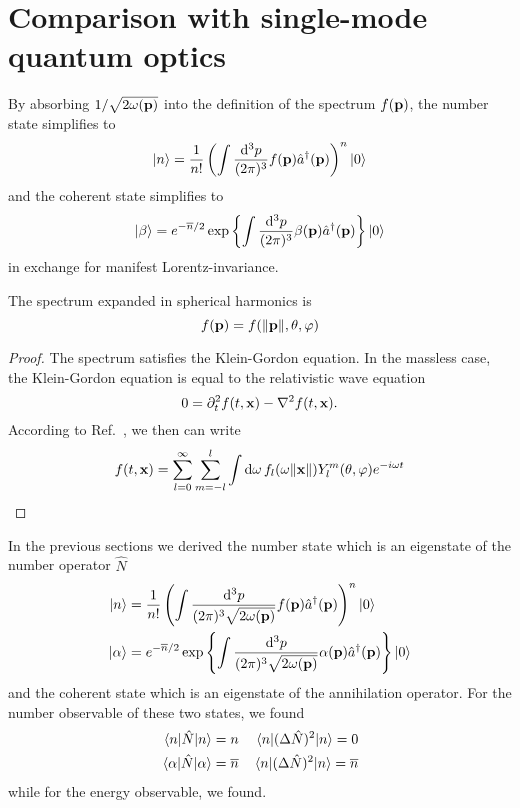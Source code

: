 \section{Comparison with single-mode quantum optics}

\begin{lemma}
	By absorbing $1/\sqrt{2\omega(\vb{p})}$ into the definition of the spectrum $f(\vb{p})$, the number state simplifies to
	\begin{equation}
		\ket{n}
		=
		\frac{1}{n!}
		\left(
			\int\frac{\dd[3]{p}}{(2\pi)^3}
			f(\vb{p})
			\hat{a}^\dagger(\vb{p})
		\right)^n
		\ket{0}
	\end{equation}
	and the coherent state simplifies to
	\begin{equation}
		\ket{\beta}
		=
		e^{-\overline{n}/2}
		\exp\left\{
			\int\frac{\dd[3]{p}}{(2\pi)^3}
			\beta(\vb{p})
			\hat{a}^\dagger(\vb{p})
		\right\}
		\ket{0}
	\end{equation}
	in exchange for manifest Lorentz-invariance.
\end{lemma}
\begin{theorem}
	The spectrum expanded in spherical harmonics is
	\begin{equation}
		f(\vb{p})
		=
		f(\norm{\vb{p}},\theta,\varphi)
	\end{equation}
\end{theorem}
\begin{proof}
	The spectrum satisfies the Klein-Gordon equation.
	In the massless case, the Klein-Gordon equation is equal to the relativistic wave equation
	\begin{equation}
		0
		=
		\partial_t^2
		f(t,\vb{x})
		-
		\laplacian
		f(t,\vb{x})
		.
	\end{equation}
	According to Ref.~\cite[p.~538]{Jackson2007}, we then can write
	\begin{equation}
		f(t,\vb{x})
		=
		\sum_{l=0}^\infty
		\sum_{m=-l}^l
		\int\dd{\omega}
		f_l(\omega\norm{\vb{x}})
		Y_l^m(\theta,\varphi)
		e^{-i\omega t}
	\end{equation}
\end{proof}

In the previous sections we derived the number state which is an eigenstate of the number operator $\hat{N}$
\begin{align}
	\ket{n}
	&=
	\frac{1}{n!}
	\left(
		\int\frac{\dd[3]{p}}{(2\pi)^3\sqrt{2\omega(\vb{p})}}
		f(\vb{p})
		\hat{a}^\dagger(\vb{p})
	\right)^n
	\ket{0}
	\\
	\ket{\alpha}
	&=
	e^{-\overline{n}/2}
	\exp\left\{
		\int\frac{\dd[3]{p}}{(2\pi)^3\sqrt{2\omega(\vb{p})}}
		\alpha(\vb{p})
		\hat{a}^\dagger(\vb{p})
	\right\}
	\ket{0}
\end{align}
and the coherent state which is an eigenstate of the annihilation operator.
For the number observable of these two states, we found
\begin{align}
	\expval{\hat{N}}{n}
	=
	n
	&&
	\expval{(\Delta\hat{N})^2}{n}
	=
	0
	\\
	\expval{\hat{N}}{\alpha}
	=
	\overline{n}
	&&
	\expval{(\Delta\hat{N})^2}{n}
	=
	\overline{n}
\end{align}
while for the energy observable, we found.


